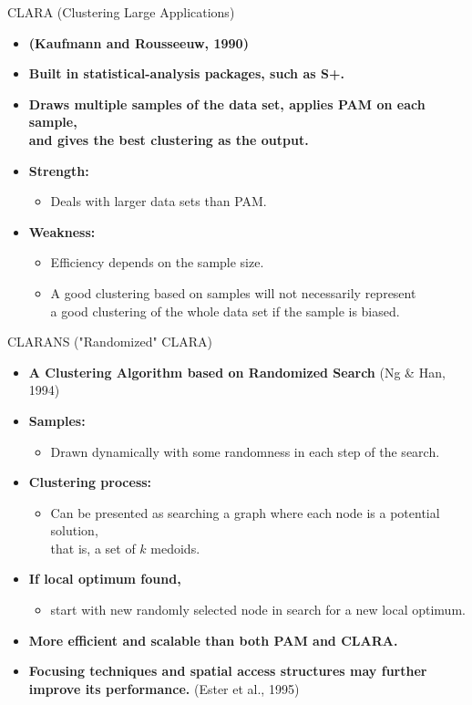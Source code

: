 \begin{frame}{CLARA (Clustering Large Applications)}
	\begin{itemize}
		\item \textbf{(Kaufmann and Rousseeuw, 1990)}
		\item \textbf{Built in statistical-analysis packages, such as S+.}
		\item \textbf{Draws multiple samples of the data set, applies PAM on
			      each sample,\\
			      and gives the best clustering as the output.}
		\item \textbf{Strength:}
		      \begin{itemize}
			      \item Deals with larger data sets than PAM.
		      \end{itemize}
		\item \textbf{Weakness:}
		      \begin{itemize}
			      \item Efficiency depends on the sample size.
			      \item A good clustering based on samples will not necessarily
			            represent \\
			            a good clustering of the whole data set if the sample is biased.
		      \end{itemize}
	\end{itemize}
\end{frame}

\begin{frame}{CLARANS ("Randomized" CLARA)}
	\begin{itemize}
		\item \textbf{A Clustering Algorithm based on Randomized Search} (Ng \&
		      Han, 1994)
		\item \textbf{Samples:}
		      \begin{itemize}
			      \item Drawn dynamically with some randomness in each step of the
			            search.
		      \end{itemize}
		\item \textbf{Clustering process:}
		      \begin{itemize}
			      \item Can be presented as searching a graph where each node is a
			            potential solution,\\
			            that is, a set of $k$ medoids.
		      \end{itemize}
		\item \textbf{If local optimum found,}
		      \begin{itemize}
			      \item start with new randomly selected node in search for a new
			            local optimum.
		      \end{itemize}
		\item \textbf{More efficient and scalable than both PAM and CLARA.}
		\item \textbf{Focusing techniques and spatial access structures may
			      further improve its performance.} (Ester et al., 1995)
	\end{itemize}
\end{frame}
